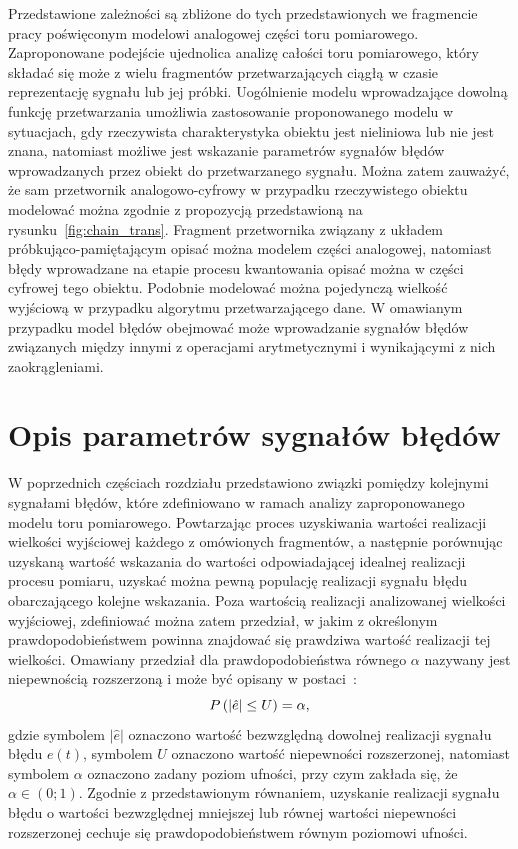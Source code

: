 Przedstawione zależności są zbliżone do tych przedstawionych we fragmencie pracy poświęconym modelowi analogowej części toru pomiarowego. Zaproponowane podejście ujednolica analizę całości toru pomiarowego, który składać się może z wielu fragmentów przetwarzających ciągłą w czasie reprezentację sygnału lub jej próbki. Uogólnienie modelu wprowadzające dowolną funkcję przetwarzania umożliwia zastosowanie proponowanego modelu w sytuacjach, gdy rzeczywista charakterystyka obiektu jest nieliniowa lub nie jest znana, natomiast możliwe jest wskazanie parametrów sygnałów błędów wprowadzanych przez obiekt do przetwarzanego sygnału. Można zatem zauważyć, że sam przetwornik analogowo-cyfrowy w przypadku rzeczywistego obiektu modelować można zgodnie z propozycją przedstawioną na rysunku~\ref{fig:chain_trans}. Fragment przetwornika związany z układem próbkująco-pamiętającym opisać można modelem części analogowej, natomiast błędy wprowadzane na etapie procesu kwantowania opisać można w części cyfrowej tego obiektu. Podobnie modelować można pojedynczą wielkość wyjściową w przypadku algorytmu przetwarzającego dane. W omawianym przypadku model błędów obejmować może wprowadzanie sygnałów błędów związanych między innymi z operacjami arytmetycznymi i wynikającymi z nich zaokrągleniami.

\section{Opis parametrów sygnałów błędów}

W poprzednich częściach rozdziału przedstawiono związki pomiędzy kolejnymi sygnałami błędów, które zdefiniowano w ramach analizy zaproponowanego modelu toru pomiarowego. Powtarzając proces uzyskiwania wartości realizacji wielkości wyjściowej każdego z omówionych fragmentów, a następnie porównując uzyskaną wartość wskazania do wartości odpowiadającej idealnej realizacji procesu pomiaru, uzyskać można pewną populację realizacji sygnału błędu obarczającego kolejne wskazania. Poza wartością realizacji analizowanej wielkości wyjściowej, zdefiniować można zatem przedział, w jakim z określonym prawdopodobieństwem powinna znajdować się prawdziwa wartość realizacji tej wielkości. Omawiany przedział dla prawdopodobieństwa równego $\alpha$ nazywany jest niepewnością rozszerzoną i może być opisany w postaci~\cite{jcgm_guide}:
\begin{equation}
P \left(|\hat{e}| \le U\right) = \alpha \label{eq:unc_definition},
\end{equation}
gdzie symbolem $|\hat{e}|$ oznaczono wartość bezwzględną dowolnej realizacji sygnału błędu $e(t)$, symbolem $U$ oznaczono wartość niepewności rozszerzonej, natomiast symbolem $\alpha$ oznaczono zadany poziom ufności, przy czym zakłada się, że $\alpha \in (0;1)$. Zgodnie z przedstawionym równaniem, uzyskanie realizacji sygnału błędu o wartości bezwzględnej mniejszej lub równej wartości niepewności rozszerzonej cechuje się prawdopodobieństwem równym poziomowi ufności.

